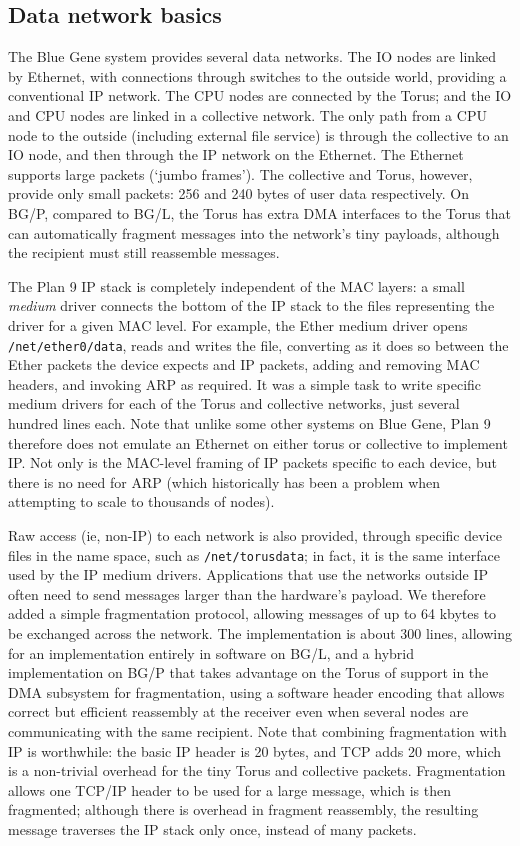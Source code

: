 \subsection{Data network basics}
The Blue Gene system provides several data networks.  The IO nodes are
linked by Ethernet, with connections through switches to the outside
world, providing a conventional IP network.  The CPU nodes are
connected by the Torus; and the IO and CPU nodes are linked in a
collective network.  The only path from a CPU node to the outside
(including external file service) is through the collective to an IO
node, and then through the IP network on the Ethernet.  The Ethernet
supports large packets (`jumbo frames').  The collective and Torus,
however, provide only small packets: 256 and 240 bytes of user data
respectively.  On BG/P, compared to BG/L, the Torus has extra DMA
interfaces to the Torus that can automatically fragment messages into
the network's tiny payloads, although the recipient must still
reassemble messages.

The Plan 9 IP stack is completely independent of the MAC layers: a
small \emph{medium} driver connects the bottom of the IP stack to the
files representing the driver for a given MAC level.  For example, the
Ether medium driver opens \texttt{/net/ether0/data}, reads and writes
the file, converting as it does so between the Ether packets the
device expects and IP packets, adding and removing MAC headers, and
invoking ARP as required.  It was a simple task to write specific
medium drivers for each of the Torus and collective networks, just
several hundred lines each.  Note that unlike some other systems on
Blue Gene, Plan 9 therefore does not emulate an Ethernet on either
torus or collective to implement IP. Not only is the MAC-level framing
of IP packets specific to each device, but there is no need for ARP
(which historically has been a problem when attempting to scale to
thousands of nodes).

Raw access (ie, non-IP) to each network is also provided, through
specific device files in the name space, such as
\texttt{/net/torusdata}; in fact, it is the same interface used by the
IP medium drivers.  Applications that use the networks outside IP
often need to send messages larger than the hardware's payload.  We
therefore added a simple fragmentation protocol, allowing messages of
up to 64 kbytes to be exchanged across the network.  The
implementation is about 300 lines, allowing for an implementation
entirely in software on BG/L, and a hybrid implementation on BG/P that
takes advantage on the Torus of support in the DMA subsystem for
fragmentation, using a software header encoding that allows correct
but efficient reassembly at the receiver even when several nodes are
communicating with the same recipient.  Note that combining
fragmentation with IP is worthwhile: the basic IP header is 20 bytes,
and TCP adds 20 more, which is a non-trivial overhead for the tiny
Torus and collective packets.  Fragmentation allows one TCP/IP header
to be used for a large message, which is then fragmented; although
there is overhead in fragment reassembly, the resulting message
traverses the IP stack only once, instead of many packets.

